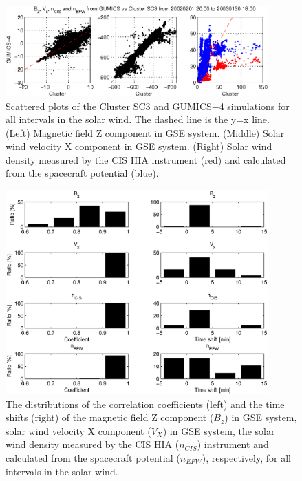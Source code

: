 \documentclass[linenumbers,draft]{agujournal}
\begin{document}
\pagebreak

\begin{figure}[h]
\centering
\includegraphics[width=0.9\textwidth,angle=0]{swe-2020-corr-f04.eps}
\caption{Scattered plots of the Cluster SC3 and GUMICS$-$4 simulations for all intervals in the solar wind. The dashed line is the y=x line. (Left) Magnetic field Z component in GSE system. (Middle) Solar wind velocity X component in GSE system. (Right) Solar wind density measured by the CIS HIA instrument (red) and calculated from the spacecraft potential (blue).}
\label{fig:swscatplot}
\end{figure}

\pagebreak

\begin{figure}[h]
\centering
\includegraphics[width=0.9\textwidth,angle=0]{swe-2020-corr-f05.eps}  
\caption{The distributions of the correlation coefficients (left) and the time shifts (right) of the magnetic field Z component ($B_z$) in GSE system, solar wind velocity X component ($V_X$) in GSE system, the solar wind density measured by the CIS HIA ($n_{CIS}$) instrument and calculated from the spacecraft potential ($n_{EFW}$), respectively, for all intervals in the solar wind.}
\label{fig:swcorrplot}
\end{figure}
\end{document}
